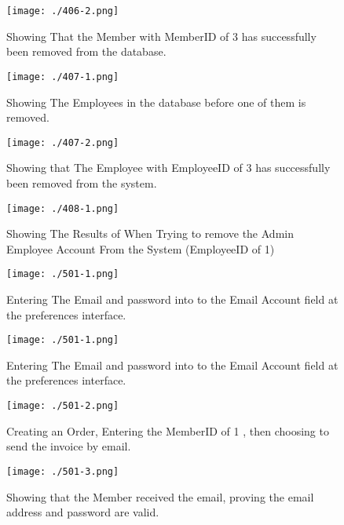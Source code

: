 \begin{figure}[H]
    \texttt{[image: ./406-2.png]}
    \caption{Showing That the Member with MemberID of 3 has successfully been removed from the database.} \label{fig:406-2}
\end{figure}

\begin{figure}[H]
    \texttt{[image: ./407-1.png]}
    \caption{Showing The Employees in the database before one of them is removed.} \label{fig:407-1}
\end{figure}

\begin{figure}[H]
    \texttt{[image: ./407-2.png]}
    \caption{Showing that The Employee with EmployeeID of 3 has successfully been removed from the system.} \label{fig:407-2}
\end{figure}

\begin{figure}[H]
    \texttt{[image: ./408-1.png]}
    \caption{Showing The Results of When Trying to remove the Admin Employee Account From the System (EmployeeID of 1)} \label{fig:408-1}
\end{figure}

\begin{figure}[H]
    \texttt{[image: ./501-1.png]}
    \caption{Entering The Email and password into to the Email Account field at the preferences interface.} \label{fig:501-1}
\end{figure}

\begin{figure}[H]
    \texttt{[image: ./501-1.png]}
    \caption{Entering The Email and password into to the Email Account field at the preferences interface.} \label{fig:501-1}
\end{figure}

\begin{figure}[H]
    \texttt{[image: ./501-2.png]}
    \caption{Creating an Order, Entering the MemberID of 1 , then choosing to send the invoice by email.} \label{fig:501-2}
\end{figure}

\begin{figure}[H]
    \texttt{[image: ./501-3.png]}
    \caption{Showing that the Member received the email, proving the email address and password are valid.} \label{fig:501-3}
\end{figure}

